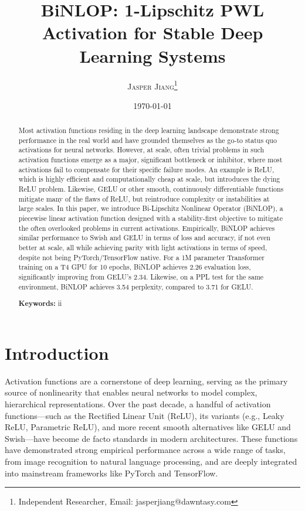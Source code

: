 \documentclass[11pt, twoside, openright, english]{article}
\title{\LARGE\textbf{BiNLOP: 1-Lipschitz PWL Activation for Stable Deep Learning Systems}}
\author{
    \normalsize\textsc{Jasper Jiang}\thanks{Independent Researcher, Email: jasperjiang@dawntasy.com} \\
}
\date{\normalsize\today}
\numberwithin{equation}{section}
\theoremstyle{plain}
\theoremstyle{definition}
\theoremstyle{remark}
\begin{document}
\maketitle
\thispagestyle{empty}

\begin{abstract}
\noindent Most activation functions residing in the deep learning landscape demonstrate strong performance in the real world and have grounded themselves as the go-to status quo activations for neural networks. However, at scale, often trivial problems in such activation functions emerge as a major, significant bottleneck or inhibitor, where most activations fail to compensate for their specific failure modes. An example is ReLU, which is highly efficient and computationally cheap at scale, but introduces the dying ReLU problem. Likewise, GELU or other smooth, continuously differentiable functions mitigate many of the flaws of ReLU, but reintroduce complexity or instabilities at large scales. In this paper, we introduce Bi-Lipschitz Nonlinear Operator (BiNLOP), a piecewise linear activation function designed with a stability-first objective to mitigate the often overlooked problems in current activations. Empirically, BiNLOP achieves similar performance to Swish and GELU in terms of loss and accuracy, if not even better at scale, all while achieving parity with light activations in terms of speed, despite not being PyTorch/TensorFlow native. For a 1M parameter Transformer training on a T4 GPU for 10 epochs, BiNLOP achieves 2.26 evaluation loss, significantly improving from GELU's 2.34. Likewise, on a PPL test for the same environment, BiNLOP achieves 3.54 perplexity, compared to 3.71 for GELU. 

\vspace{2ex}
\noindent\textbf{Keywords:} ii
\end{abstract}

\clearpage
\setcounter{page}{1}
\tableofcontents
\clearpage

\section{Introduction}
\label{sec:introduction}
Activation functions are a cornerstone of deep learning, serving as the primary source of nonlinearity that enables neural networks to model complex, hierarchical representations. Over the past decade, a handful of activation functions—such as the Rectified Linear Unit (ReLU), its variants (e.g., Leaky ReLU, Parametric ReLU), and more recent smooth alternatives like GELU and Swish—have become de facto standards in modern architectures. These functions have demonstrated strong empirical performance across a wide range of tasks, from image recognition to natural language processing, and are deeply integrated into mainstream frameworks like PyTorch and TensorFlow.
\end{document}
